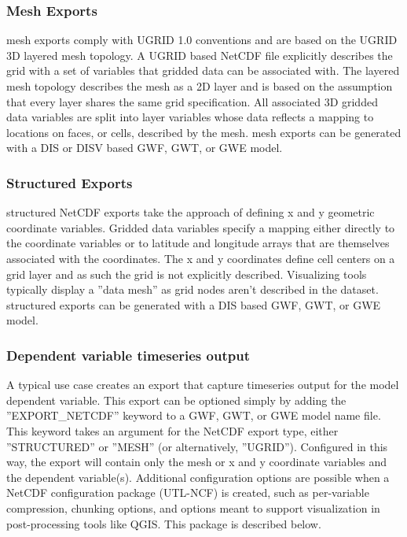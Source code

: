 \subsubsection{Mesh Exports}
\mf mesh exports comply with UGRID 1.0 conventions and are based on the UGRID 3D layered mesh topology.  A UGRID based NetCDF file explicitly describes the grid with a set of variables that gridded data can be associated with.  The layered mesh topology describes the mesh as a 2D layer and is based on the assumption that every layer shares the same grid specification.  All associated 3D gridded data variables are split into layer variables whose data reflects a mapping to locations on faces, or cells, described by the mesh.  \mf mesh exports can be generated with a DIS or DISV based GWF, GWT, or GWE model.

\subsubsection{Structured Exports}
\mf structured NetCDF exports take the approach of defining x and y geometric coordinate variables.  Gridded data variables specify a mapping either directly to the coordinate variables or to latitude and longitude arrays that are themselves associated with the coordinates.  The x and y coordinates define cell centers on a grid layer and as such the grid is not explicitly described.  Visualizing tools typically display a ''data mesh'' as grid nodes aren't described in the dataset. \mf structured exports can be generated with a DIS based GWF, GWT, or GWE model.

\subsubsection{Dependent variable timeseries output}
A typical use case creates an export that capture timeseries output for the model dependent variable.  This export can be optioned simply by adding the ''EXPORT\_NETCDF'' keyword to a GWF, GWT, or GWE model name file.  This keyword takes an argument for the NetCDF export type, either ''STRUCTURED'' or ''MESH'' (or alternatively, ''UGRID'').  Configured in this way, the export will contain only the mesh or x and y coordinate variables and the dependent variable(s).  Additional configuration options are possible when a NetCDF configuration package (UTL-NCF) is created, such as per-variable compression, chunking options, and options meant to support visualization in post-processing tools like QGIS.  This package is described below.

